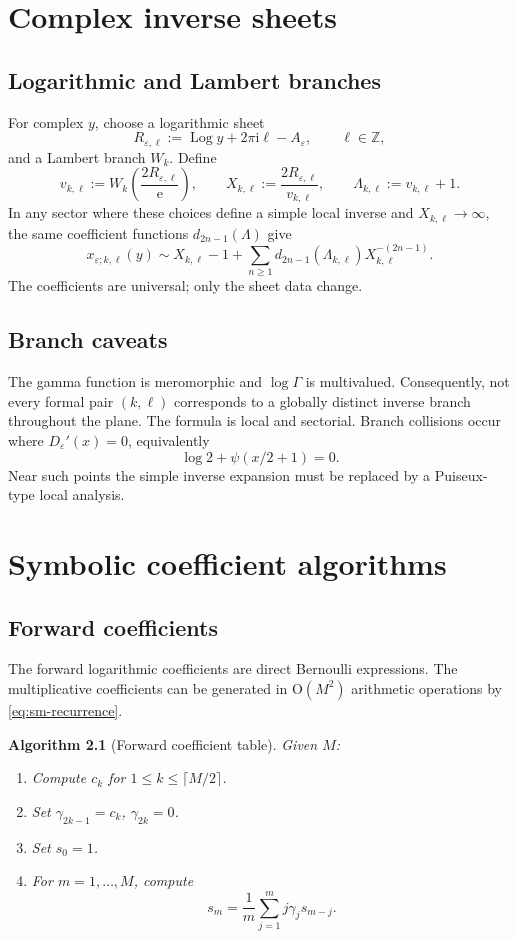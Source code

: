 \documentclass[11pt,a4paper,oneside]{book}
\newtheorem{algorithm}[theorem]{Algorithm}
\newcommand{\e}{\mathrm e}
\newcommand{\ii}{\mathrm i}
\newcommand{\Log}{\operatorname{Log}}
\newcommand{\Ord}{\mathrm O}
\newcommand{\eps}{\varepsilon}
\begin{document}
\chapter{Complex inverse sheets}

\section{Logarithmic and Lambert branches}

For complex \(y\), choose a logarithmic sheet
\[
 R_{\eps,\ell}:=\Log y+2\pi\ii\ell-A_\eps,
 \qquad \ell\in\mathbb Z,
\]
and a Lambert branch \(W_k\).  Define
\[
 v_{k,\ell}:=
 W_k\!\left(\frac{2R_{\eps,\ell}}{\e}\right),
 \qquad
 X_{k,\ell}:=\frac{2R_{\eps,\ell}}{v_{k,\ell}},
 \qquad
 \Lambda_{k,\ell}:=v_{k,\ell}+1.
\]
In any sector where these choices define a simple local inverse and
\(X_{k,\ell}\to\infty\), the same coefficient functions
\(d_{2n-1}(\Lambda)\) give
\[
 x_{\eps;k,\ell}(y)
 \sim
 X_{k,\ell}-1+
 \sum_{n\ge1}
 d_{2n-1}(\Lambda_{k,\ell})
 X_{k,\ell}^{-(2n-1)}.
\]
The coefficients are universal; only the sheet data change.

\section{Branch caveats}

The gamma function is meromorphic and \(\log\Gamma\) is multivalued.
Consequently, not every formal pair \((k,\ell)\) corresponds to a globally
distinct inverse branch throughout the plane.  The formula is local and
sectorial.  Branch collisions occur where \(D_\eps'(x)=0\), equivalently
\[
 \log2+\psi(x/2+1)=0.
\]
Near such points the simple inverse expansion must be replaced by a
Puiseux-type local analysis.

\chapter{Symbolic coefficient algorithms}

\section{Forward coefficients}

The forward logarithmic coefficients are direct Bernoulli expressions.
The multiplicative coefficients can be generated in \(\Ord(M^2)\) arithmetic
operations by \cref{eq:sm-recurrence}.

\begin{algorithm}[Forward coefficient table]
Given \(M\):
\begin{enumerate}[label=\arabic*.]
\item Compute \(c_k\) for \(1\le k\le\lceil M/2\rceil\).
\item Set \(\gamma_{2k-1}=c_k\), \(\gamma_{2k}=0\).
\item Set \(s_0=1\).
\item For \(m=1,\ldots,M\), compute
\[
 s_m=\frac1m\sum_{j=1}^m j\gamma_js_{m-j}.
\]
\end{enumerate}
\end{algorithm}
\end{document}
